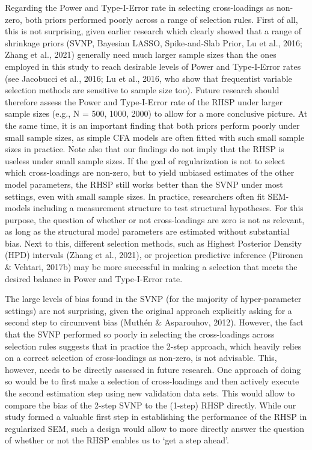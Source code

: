 \documentclass[
  man, donotrepeattitle,floatsintext]{apa6}
\begin{document}
Regarding the Power and Type-I-Error rate in selecting cross-loadings as non-zero, both priors performed poorly across a range of selection rules. First of all, this is not surprising, given earlier research which clearly showed that a range of shrinkage priors (SVNP, Bayesian LASSO, Spike-and-Slab Prior, Lu et al., 2016; Zhang et al., 2021) generally need much larger sample sizes than the ones employed in this study to reach desirable levels of Power and Type-I-Error rates (see Jacobucci et al., 2016; Lu et al., 2016, who show that frequentist variable selection methods are sensitive to sample size too). Future research should therefore assess the Power and Type-I-Error rate of the RHSP under larger sample sizes (e.g., N = 500, 1000, 2000) to allow for a more conclusive picture. At the same time, it is an important finding that both priors perform poorly under small sample sizes, as simple CFA models are often fitted with such small sample sizes in practice. Note also that our findings do not imply that the RHSP is useless under small sample sizes. If the goal of regularization is not to select which cross-loadings are non-zero, but to yield unbiased estimates of the other model parameters, the RHSP still works better than the SVNP under most settings, even with small sample sizes. In practice, researchers often fit SEM-models including a measurement structure to test structural hypotheses. For this purpose, the question of whether or not cross-loadings are zero is not as relevant, as long as the structural model parameters are estimated without substantial bias. Next to this, different selection methods, such as Highest Posterior Density (HPD) intervals (Zhang et al., 2021), or projection predictive inference (Piironen \& Vehtari, 2017b) may be more successful in making a selection that meets the desired balance in Power and Type-I-Error rate.

The large levels of bias found in the SVNP (for the majority of hyper-parameter settings) are not surprising, given the original approach explicitly asking for a second step to circumvent bias (Muthén \& Asparouhov, 2012). However, the fact that the SVNP performed so poorly in selecting the cross-loadings across selection rules suggests that in practice the 2-step approach, which heavily relies on a correct selection of cross-loadings as non-zero, is not advisable. This, however, needs to be directly assessed in future research. One approach of doing so would be to first make a selection of cross-loadings and then actively execute the second estimation step using new validation data sets. This would allow to compare the bias of the 2-step SVNP to the (1-step) RHSP directly. While our study formed a valuable first step in establishing the performance of the RHSP in regularized SEM, such a design would allow to more directly answer the question of whether or not the RHSP enables us to `get a step ahead'.
\end{document}
